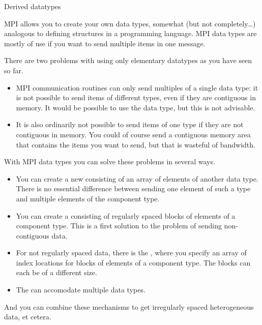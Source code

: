 
 {Derived datatypes}
\label{sec:derived-types}

MPI allows you to create your own data types, somewhat (but not completely\ldots)
analogous to defining
structures in a programming language. MPI data types are mostly of use
if you want to send multiple items in one message.

There are two problems with using only elementary datatypes
as you have seen so far.
\begin{itemize}
\item MPI communication routines can only send multiples of a
  single data type: it is not possible to send items of different
  types, even if they are contiguous in memory. It would be possible
  to use the  data type, but this is not advisable.
\item It is also ordinarily not possible to send items of one type if they are
  not contiguous in memory. You could of course send a contiguous memory area
  that contains the items you want to send, but that is wasteful of
  bandwidth.
\end{itemize}
With MPI data types you can solve these problems in several ways.
\begin{itemize}
\item You can create a new 
  consisting of an array of elements of another data type. There is no
  essential difference between sending one element of such a type
  and multiple elements of the
  component type.
\item You can create a  consisting of
  regularly spaced blocks of elements of a component type. This is a first
  solution to the problem of sending non-contiguous data.
\item For not regularly spaced data, there is the
  , where you specify an array of
  index locations for blocks of elements of a component type.
  The blocks can each be of a different size.
\item The  can accomodate multiple
  data types.
\end{itemize}
And you can combine these mechanisms to get irregularly spaced
heterogeneous data, et cetera.

